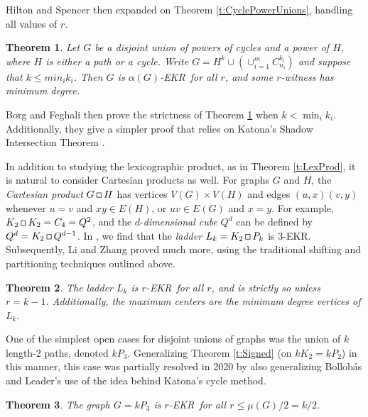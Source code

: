 \documentclass{article}
\newtheorem{thm}{Theorem}%
\def\a{{\alpha}}
\def\m{{\mu}}
\def\ekr{{\sf EKR}}
\def\sqr#1#2{{\vcenter{\hrule height.#2pt
        \hbox{\vrule width.#2pt height#1pt \kern#1pt
                \vrule width.#2pt}
        \hrule height.#2pt}}}
\def\gbox{{\mathchoice\sqr45\sqr45\sqr{2.1}3\sqr{1.5}3}}
\begin{document}
Hilton and Spencer \cite{HiltSpen,HiltSpenKing} then expanded on Theorem \ref{t:CyclePowerUnions}, handling all values of $r$.

\begin{thm}
\label{t:CyclePowerUnionsPath}
Let $G$ be a disjoint union of powers of cycles and a power of $H$, where $H$ is either a path or a cycle.
Write $G=H^k\cup\left(\cup_{i=1}^m C_{n_i}^{k_i}\right)$ and suppose that $k\le min_ik_i$.
Then $G$ is $\a(G)$-\ekr\ for all $r$, and some $r$-witness has minimum degree.
\end{thm}

Borg and Feghali \cite{BorgFegh} then prove the strictness of Theorem \ref{t:CyclePowerUnionsPath} when $k<\min_ik_i$.
Additionally, they give a simpler proof that relies on Katona's Shadow Intersection Theorem \cite{KatonaShadInt}.

In addition to studying the lexicographic product, as in Theorem \ref{t:LexProd}, it is natural to consider Cartesian products as well. 
For graphs $G$ and $H$, the {\it Cartesian product} $G\mathbin{\gbox} H$ has vertices $V(G)\times V(H)$ and edges $(u,x)(v,y)$ whenever $u=v$ and $xy\in E(H)$, or $uv\in E(G)$ and $x=y$.
For example, $K_2\mathbin{\gbox}K_2=C_4=Q^2$, and the $d$-{\it dimensional cube} $Q^d$ can be defined by $Q^d=K_2\mathbin{\gbox}Q^{d-1}$.
In \cite{HurlKamaLadders}, we find that the {\it ladder} $L_k=K_2\mathbin{\gbox}P_k$ is 3-\ekr.
Subsequently, Li and Zhang \cite{LiZhang} proved much more, using the traditional shifting and partitioning techniques outlined above.

\begin{thm}
\label{t:Ladders}
The ladder $L_k$ is $r$-\ekr\ for all $r$, and is strictly so unless $r=k-1$.
Additionally, the maximum centers are the minimum degree vertices of $L_k$.
\end{thm}


One of the simplest open cases for disjoint unions of graphs was the union of $k$ length-2 paths, denoted $kP_3$.
Generalizing Theorem \ref{t:Signed} (on $kK_2=kP_2$) in this manner, this case was partially resolved in 2020 \cite{FegHurKam} by also generalizing Bollob\'as and Leader's use of the idea behind Katona's cycle method.

\begin{thm}
\label{t:kP3}
The graph $G=kP_3$ is $r$-\ekr\ for all $r\le \m(G)/2=k/2$.
\end{thm}
\end{document}
